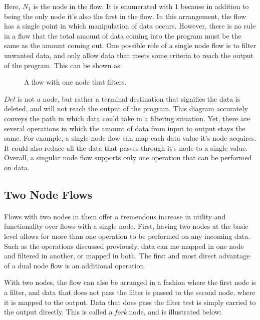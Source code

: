 \par Here, $N_1$ is the node in the flow. It is enumerated with $1$ because in addition to being the only node it's also the first in the flow. In this arrangement, the flow has a single point in which manipulation of data occurs. However, there is no rule in a flow that the total amount of data coming into the program must be the same as the amount coming out. One possible role of a single node flow is to filter unwanted data, and only allow data that meets some criteria to reach the output of the program. This can be shown as:

\begin{figure}[h]
\centering
{}
\caption{A flow with one node that filters.}
\end{figure}

\par $Del$ is not a node, but rather a terminal destination that signifies the data is deleted, and will not reach the output of the program. This diagram accurately conveys the path in which data could take in a filtering situation. Yet, there are several operations in which the amount of data from input to output stays the same. For example, a single node flow can map each data value it's node acquires. It could also reduce all the data that passes through it's node to a single value. Overall, a singular node flow supports only one operation that can be performed on data.

\subsection{Two Node Flows}

\paragraph{  } Flows with two nodes in them offer a tremendous increase in utility and functionality over flows with a single node. First, having two nodes at the basic level allows for more than one operation to be performed on any incoming data. Such as the operations discussed previously, data can me mapped in one node and filtered in another, or mapped in both. The first and most direct advantage of a dual node flow is an additional operation.
\par With two nodes, the flow can also be arranged in a fashion where the first node is a filter, and data that does not pass the filter is passed to the second node, where it is mapped to the output. Data that does pass the filter test is simply carried to the output directly. This is called a \emph{fork} node, and is illustrated below:

